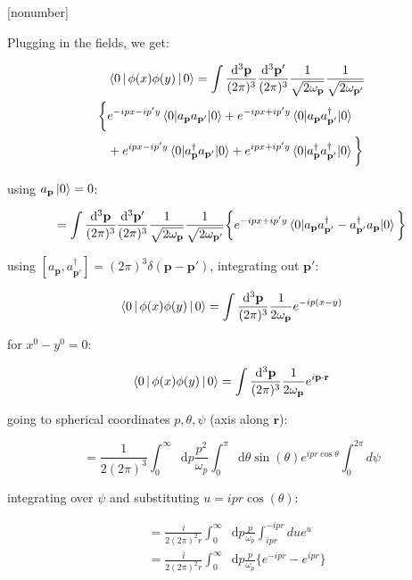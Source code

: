 \documentclass[aspectratio=169]{beamer}
\newcommand{\vp}{\mathbf{p}}
\newcommand{\vr}{\mathbf{r}}
\newcommand{\vpp}{\mathbf{p}'}
\newcommand{\omp}{\omega_{p}}
\newcommand{\omvp}{\omega_{\vp}}
\newcommand{\omvpp}{\omega_{\vpp}}
\newcommand{\ap}{a_{\vp}}
\newcommand{\app}{a_{\vpp}}
\newcommand{\adp}{a^\dagger_{\vp}}
\newcommand{\adpp}{a^\dagger_{\vpp}}
\newcommand{\diffop}{\mathop{}\!\mathrm{d}}
\newcommand{\dip}{\diffop p}
\newcommand{\dtheta}{\diffop \theta}
\newcommand{\bysqrt}[1]{\frac{1}{\sqrt{#1}}}
\newcommand{\intpthree}{\int \frac{\diffop^3\vp}{(2\pi)^3}}
\newcommand{\intpthreeppthree}{\int \frac{\diffop^3\vp}{(2\pi)^3} \frac{\diffop^3\vpp}{(2\pi)^3}}
\newcommand{\com}[2]{[{#1},{#2}]}
\newcommand{\phixy}{\Braket{0|\phi(x)\phi(y)|0}}
\begin{document}
\begin{frame}
[nonumber]
\sectionpage
\end{frame}

\begin{frame}
Plugging in the fields, we get:

\begin{equation*}
\begin{split}
& \phixy = \intpthreeppthree \bysqrt{2\omvp} \bysqrt{2\omvpp} \\
\bigg\{ & e^{-ipx-ip'y} \braket{0|\ap\app|0} + e^{-ipx+ip'y} \braket{0|\ap\adpp|0} \\
        & + e^{ipx-ip'y} \braket{0|\adp\app|0} + e^{ipx+ip'y} \braket{0|\adp\adpp|0} \bigg\}
\end{split}
\end{equation*}

using $\ap\ket{0} = 0$:

\begin{equation*}
= \intpthreeppthree \bysqrt{2\omvp} \bysqrt{2\omvpp}
\bigg\{ e^{-ipx+ip'y} \braket{0|\ap\adpp - \adpp\ap|0} \bigg\}
\end{equation*}
\end{frame}


\begin{frame}
using $\com{\ap}{\adpp} = (2\pi)^3 \delta(\vp - \vpp)$, integrating out $\vpp$:

\begin{equation*}
\phixy = \intpthree \frac{1}{2\omvp} e^{-ip(x-y)}
\end{equation*}

for $x^0 - y^0 = 0$:

\begin{equation*}
\phixy = \intpthree \frac{1}{2\omvp} e^{i\vp\cdot\vr}
\end{equation*}
\end{frame}


\begin{frame}
going to spherical coordinates $p, \theta, \psi$ (axis along $\vr$):

\begin{equation*}
= \frac{1}{2(2\pi)^3} \int_0^\infty \dip \frac{p^2}{\omp} \int_0^\pi \dtheta \sin(\theta) e^{ipr\cos{\theta}}
\int_0^{2\pi} d\psi
\end{equation*}

integrating over $\psi$ and substituting $u = ipr\cos(\theta)$:

\begin{equation*}
\begin{split}
& = \frac{i}{2(2\pi)^2 r} \int_0^\infty \dip \frac{p}{\omp} \int_{ipr}^{-ipr} du e^{u} \\
& = \frac{i}{2(2\pi)^2 r} \int_0^\infty \dip \frac{p}{\omp} \big\{ e^{-ipr} - e^{ipr} \big\}
\end{split}
\end{equation*}

\end{frame}
\end{document}
